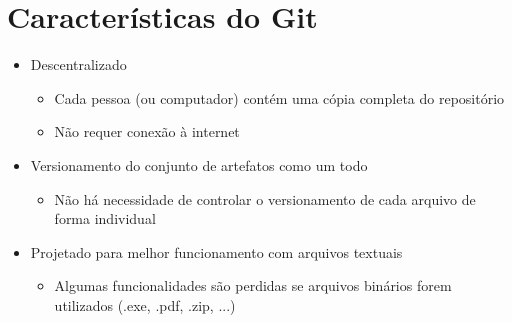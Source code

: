 \documentclass{beamer}
\newenvironment{slide}{\begin{frame}{\insertsection}}{\end{frame}}
\begin{document}
\section{Características do Git}
\begin{slide}
    \begin{itemize}
        \item Descentralizado
        \begin{itemize}
            \pause
            \item Cada pessoa (ou computador) contém uma cópia completa do
                repositório
            \pause
            \item Não requer conexão à internet
        \end{itemize}
        \pause
        \item Versionamento do conjunto de artefatos como um todo
        \begin{itemize}
            \pause
            \item Não há necessidade de controlar o versionamento de cada
                arquivo de forma individual
        \end{itemize}
        \pause
        \item Projetado para melhor funcionamento com arquivos textuais
        \begin{itemize}
            \pause
            \item Algumas funcionalidades são perdidas se arquivos binários
                forem utilizados \pause (.exe\pause, .pdf\pause, .zip\pause,
                ...)
        \end{itemize}
    \end{itemize}
\end{slide}
\end{document}
